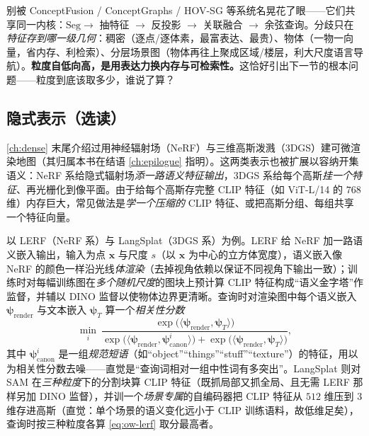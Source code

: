 \begin{insight}
别被 ConceptFusion / ConceptGraphs / HOV-SG 等系统名晃花了眼——它们共享同一内核：$\mathrm{Seg}\to$ 抽特征 $\to$ 反投影 $\to$ 关联融合 $\to$ 余弦查询。分歧只在\emph{特征存到哪一级几何}：稠密（逐点/逐体素，最富表达、最贵）、物体（一物一向量，省内存、利检索）、分层场景图（物体再往上聚成区域/楼层，利大尺度语言导航）。\textbf{粒度自低向高，是用表达力换内存与可检索性。}这恰好引出下一节的根本问题——粒度到底该取多少，谁说了算？
\end{insight}

\subsection{隐式表示（选读）}
\label{sec:openworld-implicit}

\cref{ch:dense} 末尾介绍过用神经辐射场（NeRF）与三维高斯泼溅（3DGS）建可微渲染地图（其归属本书在结语 \cref{ch:epilogue} 指明）。这两类表示也被扩展以容纳开集语义：NeRF 系给隐式辐射场\emph{添一路语义特征输出}，3DGS 系给每个高斯\emph{挂一个特征}、再光栅化到像平面\cite{paull2026openworld}。由于给每个高斯存完整 CLIP 特征（如 ViT-L/14 的 $768$ 维）内存巨大，常见做法是\emph{学一个压缩的} CLIP 特征、或把高斯分组、每组共享一个特征向量。

以 LERF\cite{kerr2023lerf}（NeRF 系）与 LangSplat\cite{qin2024langsplat}（3DGS 系）为例。LERF 给 NeRF 加一路语义嵌入输出，输入为点 $\mathbf{x}$ 与尺度 $s$（以 $\mathbf{x}$ 为中心的立方体宽度），语义嵌入像 NeRF 的颜色一样沿光线\emph{体渲染}（去掉视角依赖以保证不同视角下输出一致）；训练时对每幅训练图在\emph{多个随机尺度}的图块上预计算 CLIP 特征构成“语义金字塔”作监督，并辅以 DINO 监督以使物体边界更清晰。查询时对渲染图中每个语义嵌入 $\boldsymbol\psi_{\mathrm{render}}$ 与文本嵌入 $\boldsymbol\psi_T$ 算一个\emph{相关性分数}
\begin{equation}
  \min_{i}\ \frac{\exp\!\big(\langle\boldsymbol\psi_{\mathrm{render}},\boldsymbol\psi_T\rangle\big)}
  {\exp\!\big(\langle\boldsymbol\psi_{\mathrm{render}},\boldsymbol\psi_{\mathrm{canon}}^{i}\rangle\big)+\exp\!\big(\langle\boldsymbol\psi_{\mathrm{render}},\boldsymbol\psi_T\rangle\big)},
  \label{eq:ow-lerf}
\end{equation}
其中 $\boldsymbol\psi_{\mathrm{canon}}^{i}$ 是一组\emph{规范短语}（如“object”“things”“stuff”“texture”）的特征，用以为相关性分数去噪——直觉是“查询词相对一组中性词有多突出”。LangSplat 则对 SAM 在\emph{三种粒度}下的分割块算 CLIP 特征（既抓局部又抓全局、且无需 LERF 那样另加 DINO 监督），并训一个\emph{场景专属}的自编码器把 CLIP 特征从 $512$ 维压到 $3$ 维存进高斯（直觉：单个场景的语义变化远小于 CLIP 训练语料，故低维足矣），查询时按三种粒度各算 \cref{eq:ow-lerf} 取分最高者。

